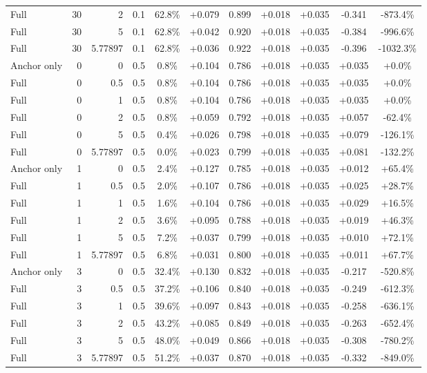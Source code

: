 \begin{table}[htbp]
\begin{tabular}{lrrrccccccc}
Full & 30 & 2 & 0.1 & 62.8\% & +0.079 & 0.899 & +0.018 & +0.035 & -0.341 & -873.4\% \\
Full & 30 & 5 & 0.1 & 62.8\% & +0.042 & 0.920 & +0.018 & +0.035 & -0.384 & -996.6\% \\
Full & 30 & 5.77897 & 0.1 & 62.8\% & +0.036 & 0.922 & +0.018 & +0.035 & -0.396 & -1032.3\% \\
Anchor only & 0 & 0 & 0.5 & 0.8\% & +0.104 & 0.786 & +0.018 & +0.035 & +0.035 & +0.0\% \\
Full & 0 & 0.5 & 0.5 & 0.8\% & +0.104 & 0.786 & +0.018 & +0.035 & +0.035 & +0.0\% \\
Full & 0 & 1 & 0.5 & 0.8\% & +0.104 & 0.786 & +0.018 & +0.035 & +0.035 & +0.0\% \\
Full & 0 & 2 & 0.5 & 0.8\% & +0.059 & 0.792 & +0.018 & +0.035 & +0.057 & -62.4\% \\
Full & 0 & 5 & 0.5 & 0.4\% & +0.026 & 0.798 & +0.018 & +0.035 & +0.079 & -126.1\% \\
Full & 0 & 5.77897 & 0.5 & 0.0\% & +0.023 & 0.799 & +0.018 & +0.035 & +0.081 & -132.2\% \\
Anchor only & 1 & 0 & 0.5 & 2.4\% & +0.127 & 0.785 & +0.018 & +0.035 & +0.012 & +65.4\% \\
Full & 1 & 0.5 & 0.5 & 2.0\% & +0.107 & 0.786 & +0.018 & +0.035 & +0.025 & +28.7\% \\
Full & 1 & 1 & 0.5 & 1.6\% & +0.104 & 0.786 & +0.018 & +0.035 & +0.029 & +16.5\% \\
Full & 1 & 2 & 0.5 & 3.6\% & +0.095 & 0.788 & +0.018 & +0.035 & +0.019 & +46.3\% \\
Full & 1 & 5 & 0.5 & 7.2\% & +0.037 & 0.799 & +0.018 & +0.035 & +0.010 & +72.1\% \\
Full & 1 & 5.77897 & 0.5 & 6.8\% & +0.031 & 0.800 & +0.018 & +0.035 & +0.011 & +67.7\% \\
Anchor only & 3 & 0 & 0.5 & 32.4\% & +0.130 & 0.832 & +0.018 & +0.035 & -0.217 & -520.8\% \\
Full & 3 & 0.5 & 0.5 & 37.2\% & +0.106 & 0.840 & +0.018 & +0.035 & -0.249 & -612.3\% \\
Full & 3 & 1 & 0.5 & 39.6\% & +0.097 & 0.843 & +0.018 & +0.035 & -0.258 & -636.1\% \\
Full & 3 & 2 & 0.5 & 43.2\% & +0.085 & 0.849 & +0.018 & +0.035 & -0.263 & -652.4\% \\
Full & 3 & 5 & 0.5 & 48.0\% & +0.049 & 0.866 & +0.018 & +0.035 & -0.308 & -780.2\% \\
Full & 3 & 5.77897 & 0.5 & 51.2\% & +0.037 & 0.870 & +0.018 & +0.035 & -0.332 & -849.0\% \\

\end{tabular}
\end{table}
